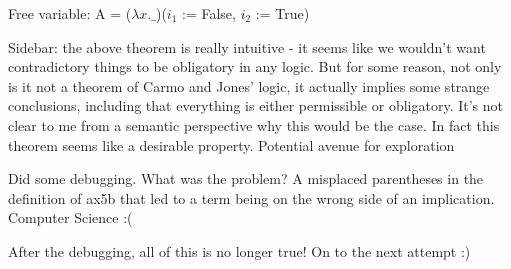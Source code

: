\begin{isabellebody}
{  Free variable:
    A = ($\lambda x. \_$)($i_1$ := False, $i_2$ := True)%
}%
\endisatagproof
{\isafoldproof}%
%
\isadelimproof
%
\endisadelimproof
%
\begin{isamarkuptext}%
Sidebar: the above theorem is really intuitive - it seems like we wouldn't want 
contradictory things to be obligatory in any logic. But for some reason, not only is it not
a theorem of Carmo and Jones' logic, it actually implies some strange conclusions, including 
that everything is either permissible or obligatory. It's not clear to me from a semantic 
perspective why this would be the case. In fact this theorem seems like a desirable 
property. Potential avenue for exploration%
\end{isamarkuptext}\isamarkuptrue%
%
\begin{isamarkuptext}%
Did some debugging. What was the problem? A misplaced parentheses in the definition 
of ax5b that led to a term being on the wrong side of an implication. Computer Science :(%
\end{isamarkuptext}\isamarkuptrue%
%
\begin{isamarkuptext}%
After the debugging, all of this is no longer true! On to the next attempt :)%
\end{isamarkuptext}\isamarkuptrue%
%
\isadelimtheory
%
\endisadelimtheory
%
\isatagtheory
{}\isamarkupfalse%
%
\endisatagtheory
{\isafoldtheory}%
%
\isadelimtheory
%
\endisadelimtheory
%
\end{isabellebody}%
\endinput
